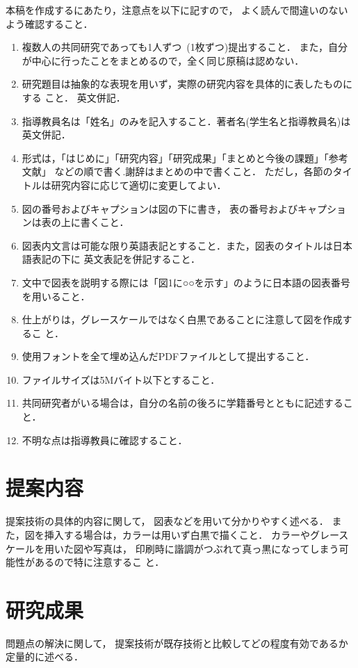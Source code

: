 \documentclass[twocolumn, a4paper]{icethesisabst}
\begin{document}
本稿を作成するにあたり，注意点を以下に記すので，
よく読んで間違いのないよう確認すること．
\begin{enumerate}
 \item
複数人の共同研究であっても1人ずつ~(1枚ずつ)提出すること．
また，自分が中心に行ったことをまとめるので，全く同じ原稿は認めない．
\item
研究題目は抽象的な表現を用いず，実際の研究内容を具体的に表したものにする
     こと．
英文併記．
\item
指導教員名は「姓名」のみを記入すること．著者名(学生名と指導教員名)は英文併記．
\item
形式は，「はじめに」「研究内容」「研究成果」「まとめと今後の課題」「参考
     文献」
などの順で書く.謝辞はまとめの中で書くこと．
ただし，各節のタイトルは研究内容に応じて適切に変更してよい．
\item
図の番号およびキャプションは図の下に書き，
表の番号およびキャプションは表の上に書くこと．
\item
図表内文言は可能な限り英語表記とすること．また，図表のタイトルは日本語表記の下に
英文表記を併記すること．
\item
文中で図表を説明する際には「図1に○○を示す」のように日本語の図表番号を用いること．
\item
仕上がりは，グレースケールではなく白黒であることに注意して図を作成するこ
     と．
\item
使用フォントを全て埋め込んだPDFファイルとして提出すること．
\item
ファイルサイズは5Mバイト以下とすること．
\item
共同研究者がいる場合は，自分の名前の後ろに学籍番号とともに記述すること．
\item
不明な点は指導教員に確認すること．
\end{enumerate}

\section{提案内容}
提案技術の具体的内容に関して，
図表などを用いて分かりやすく述べる．
また，図を挿入する場合は，カラーは用いず白黒で描くこと．
カラーやグレースケールを用いた図や写真は，
印刷時に諧調がつぶれて真っ黒になってしまう可能性があるので特に注意するこ
と．

\section{研究成果}
問題点の解決に関して，
提案技術が既存技術と比較してどの程度有効であるか定量的に述べる．
\end{document}
